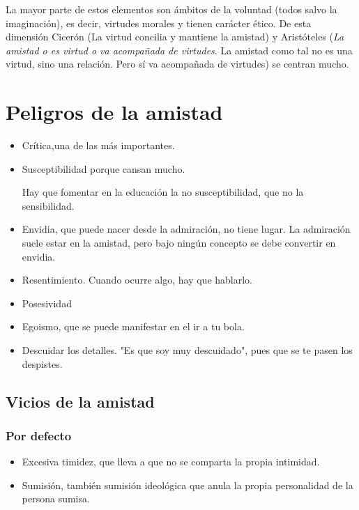 \documentclass[palatino]{apuntesURJC}
\begin{document}
La mayor parte de estos elementos son ámbitos de la voluntad (todos salvo la imaginación), es decir, virtudes morales y tienen carácter ético.
%
De esta dimensión Cicerón (La virtud concilia y mantiene la amistad) y Aristóteles (\textit{La amistad o es virtud o va acompañada de virtudes}. La amistad como tal no es una virtud, sino una relación. Pero sí va acompañada de virtudes) se centran mucho.

\section{Peligros de la amistad}

\begin{itemize}
\item Crítica,una de las más importantes.
\item Susceptibilidad porque cansan mucho.

\subitem Hay que fomentar en la educación la no susceptibilidad, que no la sensibilidad.

\item Envidia, que puede nacer desde la admiración, no tiene lugar.
%
\subitem La admiración suele estar en la amistad, pero bajo ningún concepto se debe convertir en envidia.
%
\item Resentimiento. Cuando ocurre algo, hay que hablarlo.
%
\item Posesividad
\item Egoismo, que se puede manifestar en el ir a tu bola.
\item Descuidar los detalles. "Es que soy muy descuidado", pues que se te pasen los despistes.
\end{itemize}

\subsection{Vicios de la amistad}

\subsubsection{Por defecto}

\begin{itemize}
	\item Excesiva timidez, que lleva a que no se comparta la propia intimidad.
	\item Sumisión, también sumisión ideológica que anula la propia personalidad de la persona sumisa.
\end{itemize}
\end{document}
